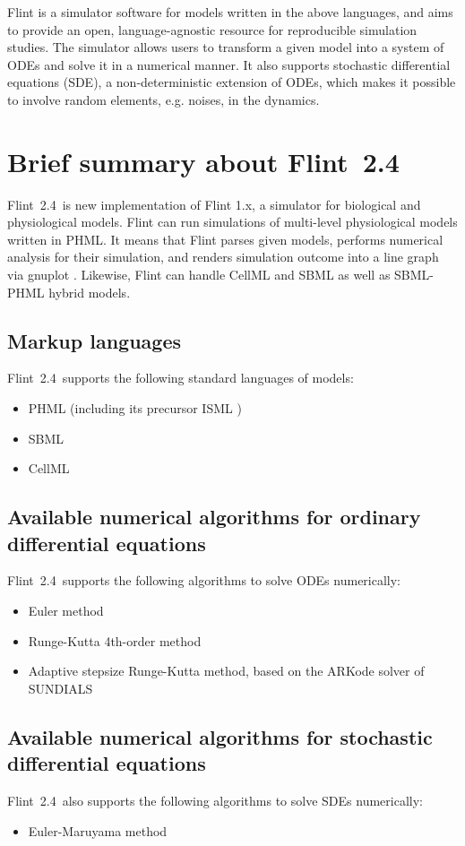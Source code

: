\documentclass[a4paper,10pt]{report}
\def\FlintVersion{2.4}
\def\Flint{Flint~\FlintVersion}
\def\Tagline{a simulator for biological and physiological models}
\begin{document}
Flint is a simulator software for models written in the above languages, and
aims to provide an open, language-agnostic resource for reproducible simulation
studies. The simulator allows users to transform a given model into a system of
ODEs and solve it in a numerical manner. It also supports stochastic
differential equations (SDE), a non-deterministic extension of ODEs, which makes
it possible to involve random elements, e.g. noises, in the dynamics.

\section{Brief summary about \Flint}
\Flint~is new implementation of Flint 1.x, \Tagline.
Flint can run simulations of multi-level physiological models written in PHML.
It means that Flint parses given models, performs numerical analysis for their
simulation, and renders simulation outcome into a line graph via gnuplot \cite{gnuplot}.
Likewise, Flint can handle CellML and SBML as well as SBML-PHML hybrid models.

\subsection{Markup languages}
\Flint\ supports the following standard languages of models:
\begin{itemize}
\item PHML (including its precursor ISML \cite{ISML})
\item SBML
\item CellML
\end{itemize}

\subsection{Available numerical algorithms for ordinary differential equations}
\Flint\ supports the following algorithms to solve ODEs numerically:
\begin{itemize}
\item Euler method
\item Runge-Kutta 4th-order method
\item Adaptive stepsize Runge-Kutta method, based on the ARKode solver of
  SUNDIALS \cite{hindmarsh2005sundials}
\end{itemize}

\subsection{Available numerical algorithms for stochastic differential equations}
\Flint\ also supports the following algorithms to solve SDEs
numerically:
\begin{itemize}
\item Euler-Maruyama method \cite{Allen2007}
\end{itemize}
\end{document}
